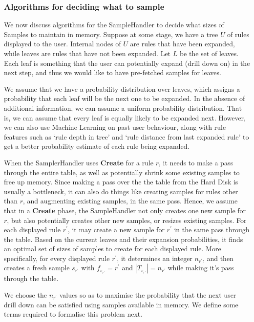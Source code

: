 \subsubsection{Algorithms for deciding what to sample}\label{sec:sampling_algorithms}
We now discuss algorithms for the SampleHandler to decide what sizes of Samples to maintain in memory. Suppose at some stage, we have a tree $U$ of rules displayed to the user. Internal nodes of $U$ are rules that have been expanded, while leaves are rules that have not been expanded. Let $L$ be the set of leaves. Each leaf is something that the user can potentially expand (drill down on) in the next step, and thus we would like to have pre-fetched samples for leaves.

We assume that we have a probability distribution over leaves, which assigns a probability that each leaf will be the next one to be expanded. In the absence of additional information, we can assume a uniform probability distribution. That is, we can assume that every leaf is equally likely to be expanded next. However, we can also use Machine Learning on past user behaviour, along with rule features such as `rule depth in tree' and `rule distance from last expanded rule' to get a better probability estimate of each rule being expanded. 

When the SamplerHandler uses \textbf{Create} for a rule $r$, it needs to make a pass through the entire table, as well as potentially shrink some existing samples to free up memory. Since making a pass over the the table from the Hard Disk is usually a bottleneck, it can also do things like creating samples for rules other than $r$, and augmenting existing samples, in the same pass. Hence, we assume that in a \textbf{Create} phase, the SampleHandler not only creates one new sample for $r$, but also potentially creates other new samples, or resizes existing samples. For each displayed rule $r^{\prime}$, it may create a new sample for $r^{\prime}$ in the same pass through the table. Based on the current leaves and their expansion probabilities, it finds an optimal set of sizes of samples to create for each displayed rule. More specifically, for every displayed rule $r^{\prime}$, it determines an integer $n_{r^{\prime}}$, and then creates a fresh sample $s_{r^{\prime}}$ with $f_{s_{r^{\prime}}} = r^{\prime}$ and $|T_{s_{r^{\prime}}}| = n_{r^{\prime}}$ while making it's pass through the table. 

We choose the $n_{r^{\prime}}$ values so as to maximise the probability that the next user drill down can be satisfied using samples available in memory. We define some terms required to formalise this problem next. 

